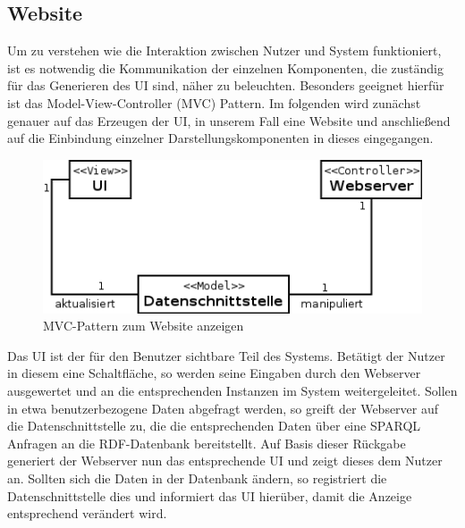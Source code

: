 

\subsection*{Website}
\noindent Um zu verstehen wie die Interaktion zwischen Nutzer und System funktioniert, ist es notwendig die Kommunikation der einzelnen Komponenten, die zuständig für das Generieren des UI sind, näher zu beleuchten. 
Besonders geeignet hierfür ist das Model-View-Controller (MVC) Pattern. 
Im folgenden wird zunächst genauer auf das Erzeugen der UI, in unserem Fall eine Website und anschließend auf die Einbindung einzelner Darstellungskomponenten in dieses eingegangen. \\

\begin{figure}[h]
\centering
\includegraphics[width=1.0\linewidth]{Grafik/Diagramm/Pattern/MVC/Website/Kontextdiagramm.png}
\caption[MVC Website Klassen]{MVC-Pattern zum Website anzeigen}
\end{figure}

\noindent  Das UI ist der für den Benutzer sichtbare Teil des Systems. Betätigt der Nutzer in diesem eine Schaltfläche, so werden seine Eingaben durch den Webserver ausgewertet und an die entsprechenden Instanzen im System weitergeleitet. Sollen in etwa benutzerbezogene Daten abgefragt werden, so greift der Webserver auf die Datenschnittstelle zu, die die entsprechenden Daten über eine SPARQL Anfragen an die RDF-Datenbank bereitstellt. Auf Basis dieser Rückgabe generiert der Webserver nun das entsprechende UI und  zeigt dieses dem Nutzer an.
Sollten sich die Daten in der Datenbank ändern, so registriert die Datenschnittstelle dies und informiert das UI hierüber, damit die Anzeige entsprechend verändert wird.


